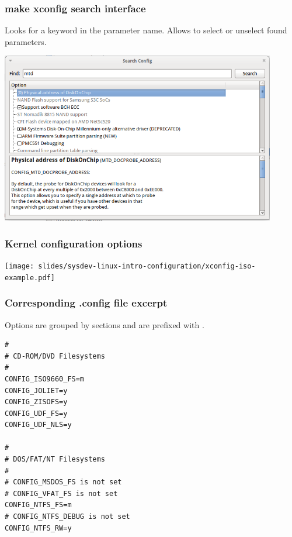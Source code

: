 \begin{frame}
  \frametitle{make xconfig search interface}

  Looks for a keyword in the parameter name. Allows to select or
  unselect found parameters.

  \begin{center}
    \includegraphics[width=0.9\textwidth]{slides/sysdev-linux-intro-configuration/xconfig-search.png}
  \end{center}
\end{frame}

\begin{frame}
\frametitle{Kernel configuration options}
  \begin{center}
    \texttt{[image: slides/sysdev-linux-intro-configuration/xconfig-iso-example.pdf]}
  \end{center}
\end{frame}

\begin{frame}[fragile]
  \frametitle{Corresponding .config file excerpt}
  Options are grouped by sections and are prefixed with
  .
\small
\begin{verbatim}
#
# CD-ROM/DVD Filesystems
#
CONFIG_ISO9660_FS=m
CONFIG_JOLIET=y
CONFIG_ZISOFS=y
CONFIG_UDF_FS=y
CONFIG_UDF_NLS=y

#
# DOS/FAT/NT Filesystems
#
# CONFIG_MSDOS_FS is not set
# CONFIG_VFAT_FS is not set
CONFIG_NTFS_FS=m
# CONFIG_NTFS_DEBUG is not set
CONFIG_NTFS_RW=y
\end{verbatim}
\end{frame}

